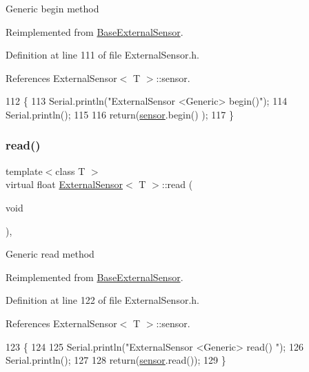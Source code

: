 Generic begin method 

Reimplemented from \hyperlink{classBaseExternalSensor_a87d132803d4f4fdd4e66332809f0c9a0}{Base\+External\+Sensor}.



Definition at line 111 of file External\+Sensor.\+h.



References External\+Sensor$<$ T $>$\+::sensor.


\begin{DoxyCode}
112     \{
113         Serial.println(\textcolor{stringliteral}{"ExternalSensor <Generic> begin()"});
114         Serial.println();
115 
116         \textcolor{keywordflow}{return}(\hyperlink{classExternalSensor_a6e1f518119abe08c14b498ce24a7e1b3}{sensor}.begin() );  
117     \}
\end{DoxyCode}
\mbox{\label{classExternalSensor_a5fb3afc7d244fb86dac68ab5481bc407}} 
\subsubsection{\texorpdfstring{read()}{read()}}
{\footnotesize\ttfamily template$<$class T $>$ \\
virtual float \hyperlink{classExternalSensor}{External\+Sensor}$<$ T $>$\+::read (\begin{DoxyParamCaption}\item[{void}]{ }\end{DoxyParamCaption})\hspace{0.3cm}{\ttfamily [inline]}, {\ttfamily [virtual]}}

Generic read method 

Reimplemented from \hyperlink{classBaseExternalSensor_a1564f16deacf57b51b9948ac29db4291}{Base\+External\+Sensor}.



Definition at line 122 of file External\+Sensor.\+h.



References External\+Sensor$<$ T $>$\+::sensor.


\begin{DoxyCode}
123     \{
124 
125         Serial.println(\textcolor{stringliteral}{"ExternalSensor <Generic> read() "});
126         Serial.println();
127         
128         \textcolor{keywordflow}{return}(\hyperlink{classExternalSensor_a6e1f518119abe08c14b498ce24a7e1b3}{sensor}.read());
129     \}
\end{DoxyCode}


